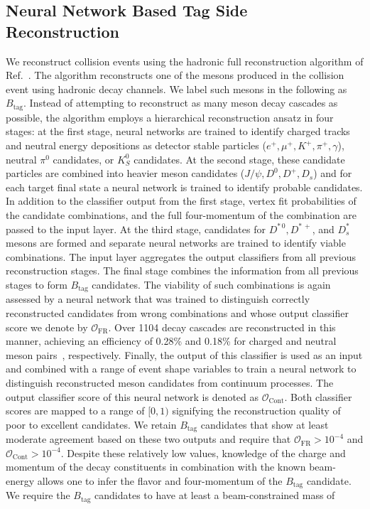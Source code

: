 \documentclass[twocolumn,aps,prd,superscriptaddress,nofootinbib,floatfix,preprintnumbers,a4]{revtex4-1}
\begin{document}
\subsection{Neural Network Based Tag Side Reconstruction}

We reconstruct collision events using the hadronic full reconstruction algorithm of Ref.~\cite{Feindt:2011mr}. The algorithm reconstructs one of the \PB mesons produced in the collision event using hadronic decay channels. We label such \PB mesons in the following as $B_{\mathrm{tag}}$. Instead of attempting to reconstruct as many \PB meson decay cascades as possible, the algorithm employs a hierarchical reconstruction ansatz in four stages: at the first stage, neural networks are trained to identify charged tracks and neutral energy depositions as detector stable particles ($e^+, \mu^+, K^+, \pi^+, \gamma$), neutral $\pi^0$ candidates, or $K_S^0$ candidates. At the second stage, these candidate particles are combined into heavier meson candidates ($J/\psi, D^0, D^{+}, D_s$) and for each target final state a neural network is trained to identify probable candidates. In addition to the classifier output from the first stage, vertex fit probabilities of the candidate combinations, and the full four-momentum of the combination are passed to the input layer. At the third stage, candidates for $D^{*\, 0}, D^{*\, +}$, and $D_s^*$ mesons are formed and separate neural networks are trained to identify viable combinations. The input layer aggregates the output classifiers from all previous reconstruction stages. The final stage combines the information from all previous stages to form $B_{\mathrm{tag}}$ candidates. The viability of such combinations is again assessed by a neural network that was trained to distinguish correctly reconstructed candidates from wrong combinations and whose output classifier score we denote by $\mathcal{O}_{\mathrm{FR}}$. Over 1104 decay cascades are reconstructed in this manner, achieving an efficiency of 0.28\% and 0.18\% for charged and neutral \PB meson pairs~\cite{Bevan:2014iga}, respectively. Finally, the output of this classifier is used as an input and combined with a range of event shape variables to train a neural network to distinguish reconstructed \PB meson candidates from continuum processes. The output classifier score of this neural network is denoted as $\mathcal{O}_{\mathrm{Cont}}$. Both classifier scores are mapped to a range of $[0,1)$ signifying the reconstruction quality of poor to excellent candidates. We retain $B_{\mathrm{tag}}$ candidates that show at least moderate agreement based on these two outputs and require that $\mathcal{O}_{\mathrm{FR}} > 10^{-4}$ and  $\mathcal{O}_{\mathrm{Cont}} > 10^{-4}$. Despite these relatively low values, knowledge of the charge and momentum of the decay constituents in combination with the known beam-energy allows one to infer the flavor and four-momentum of the $B_{\mathrm{tag}}$ candidate. We require the $B_{\mathrm{tag}}$ candidates to have at least a beam-constrained mass of
\end{document}
